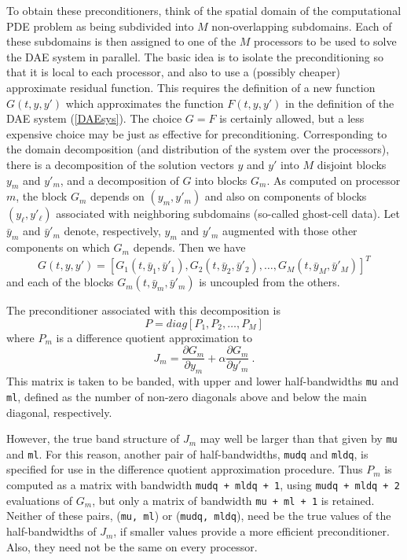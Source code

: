 \documentclass[11pt]{article}
\begin{document}
To obtain these preconditioners, think of the spatial domain of the
computational PDE problem as being subdivided into $M$ non-overlapping
subdomains.  Each of these subdomains is then assigned to one of the
$M$ processors to be used to solve the DAE system in parallel. The
basic idea is to isolate the preconditioning so that it is local to
each processor, and also to use a (possibly cheaper) approximate
residual function. This requires the definition of a new function
$G(t,y,y')$ which approximates the function $F(t,y,y')$ in the
definition of the DAE system (\ref{DAEsys}).  The choice $G = F$ is
certainly allowed, but a less expensive choice may be just as
effective for preconditioning.  Corresponding to the domain
decomposition (and distribution of the system over the processors),
there is a decomposition of the solution vectors $y$ and $y'$ into $M$
disjoint blocks $y_m$ and $y'_m$, and a decomposition of $G$ into blocks
$G_m$.  As computed on processor $m$, the block $G_m$ depends on
$(y_m,y'_m)$ and also on components of blocks $(y_{\ell},y'_{\ell})$
associated with neighboring subdomains (so-called ghost-cell data).
Let $\bar{y}_m$ and $\bar{y}'_m$ denote, respectively, $y_m$ and
$y'_m$ augmented with those other components on which $G_m$ depends.
Then we have
\[
G(t,y,y') = [G_1(t,\bar{y}_1,\bar{y}'_1), G_2(t,\bar{y}_2,\bar{y}'_2),
              \ldots, G_M(t,\bar{y}_M,\bar{y}'_M)]^T
\]
and each of the blocks $G_m(t,\bar{y}_m,\bar{y}'_m)$ is uncoupled from
the others.

The preconditioner associated with this decomposition is
\[
P = diag[P_1, P_2, \ldots, P_M]
\]
where 
$P_m$ is a difference quotient approximation to 
\[
  J_m = \frac{\partial G_m}{\partial y_m} + 
           \alpha \frac{\partial G_m}{\partial y'_m} ~. 
\]
This matrix is taken to be banded, with upper and lower
half-bandwidths {\tt mu} and {\tt ml}, defined as the number of
non-zero diagonals above and below the main diagonal,
respectively. 

However, the true band structure of $J_m$ may well be larger than
that given by {\tt mu} and {\tt ml}.  For this reason, another pair of
half-bandwidths, {\tt mudq} and {\tt mldq}, is specified for use in
the difference quotient approximation procedure.  Thus $P_m$ is
computed as a matrix with bandwidth {\tt mudq + mldq + 1}, using 
{\tt mudq + mldq + 2} evaluations of $G_m$, but only a matrix of
bandwidth {\tt mu + ml + 1} is retained.  Neither of these pairs,
({\tt mu, ml}) or ({\tt mudq, mldq}), need be the true values of the
half-bandwidths of $J_m$, if smaller values provide a more efficient
preconditioner.  Also, they need not be the same on every processor.
\end{document}
